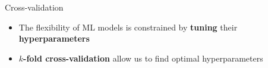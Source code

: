 \documentclass[pdf]{beamer}
\begin{document}
\begin{frame}{Cross-validation}

\begin{itemize}\addtolength{\itemsep}{0.25\baselineskip}
	\item The flexibility of ML models is constrained by \textbf{tuning} their \textbf{hyperparameters}
	\item \textbf{$k$-fold cross-validation} allow us to find optimal hyperparameters
\end{itemize}

\begin{center}
\vfill
\centering
{}
\end{center}
\end{frame}
\end{document}
